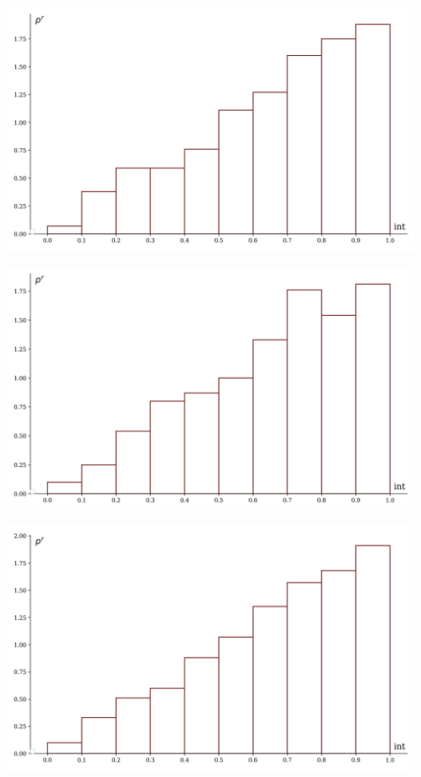 \documentclass[a4paper, 14pt]{extarticle}
\begin{document}
\begin{minipage}[t]{0.25\textwidth}
\includegraphics[width=\textwidth, height=\textheight, keepaspectratio]{sample21_hist}
\end{minipage}%
\begin{minipage}[t]{0.25\textwidth}
\includegraphics[width=\textwidth, height=\textheight, keepaspectratio]{sample22_hist}
\end{minipage}%
\begin{minipage}[t]{0.25\textwidth}
\includegraphics[width=\textwidth, height=\textheight, keepaspectratio]{sample23_hist}
\end{minipage}%
\end{document}
